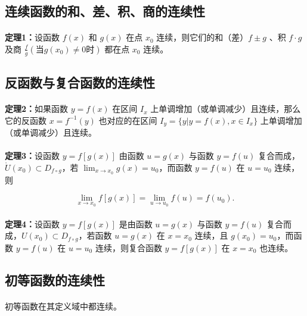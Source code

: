 \subsection{连续函数的和、差、积、商的连续性}
\paragraph{}
\textbf{定理1：}设函数 $f(x)$ 和 $g(x)$ 在点 $x_0$ 连续，则它们的和（差）$f\pm g$ 、积 $f\cdot g$ 及商 $\frac{f}{g}(\text{当} g(x_0) \neq 0 \text{时})$ 都在点 $x_0$ 连续。

\subsection{反函数与复合函数的连续性}
\paragraph{}
\textbf{定理2：}如果函数 $y = f(x)$ 在区间 $I_x$ 上单调增加（或单调减少）且连续，那么它的反函数 $x = f^{-1}(y)$ 也对应的在区间 $I_y = \{y | y = f(x), x \in I_x\}$ 上单调增加（或单调减少）且连续。

\paragraph{}
\textbf{定理3：}设函数 $y = f[g(x)]$ 由函数 $u = g(x)$ 与函数 $y = f(u)$ 复合而成，$\mathring{U}(x_0) \subset D_{f \circ g}$，若 $\lim_{x \to x_0} g(x) = u_0$，而函数 $y = f(u)$ 在 $u = u_0$ 连续，则

\begin{equation}
\lim_{x \to x_0} f[g(x)] = \lim_{u \to u_0} f(u) = f(u_0).
\end{equation}

\paragraph{}
\textbf{定理4：}设函数 $y = f[g(x)]$ 是由函数 $u = g(x)$ 与函数 $y = f(u)$ 复合而成，$U(x_0) \subset D_{f \circ g}$，若函数 $u = g(x)$ 在 $x = x_0$ 连续，且 $g(x_0) = u_0$，而函数 $y = f(u)$ 在 $u = u_0$ 连续，则复合函数 $y = f[g(x)]$ 在 $x = x_0$ 也连续。

\subsection{初等函数的连续性}
\paragraph{}
初等函数在其定义域中都连续。
